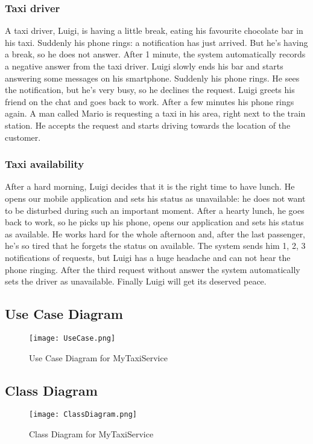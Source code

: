 		\subsubsection{Taxi driver}
			A taxi driver, Luigi, is having a little break, eating his favourite chocolate bar in his taxi. Suddenly
			his phone rings: a notification has just arrived. But he's having a break, so he does not answer.
			After 1 minute, the system automatically records a negative answer from the taxi driver.
			Luigi slowly ends his bar and starts answering some messages on his smartphone. Suddenly his phone
			rings. He sees the notification, but he's very busy, so he declines the request. Luigi greets his
			friend on the chat and goes back to work. After a few minutes his phone rings again. A man called
			Mario is requesting a taxi in his area, right next to the train station. He accepts the request and
			starts driving towards the location of the customer.
		\subsubsection{Taxi availability}
			After a hard morning, Luigi decides that it is the right time to have lunch. He opens our mobile
			application and sets his status as unavailable: he does not want to be disturbed during such an
			important moment. After a hearty lunch, he goes back to work, so he picks up his phone, opens our
			application and sets his status as available. He works hard for the whole afternoon and, after the
			last passenger, he's so tired that he forgets the status on available. The system sends him 1, 2, 3
			notifications of requests, but Luigi has a huge headache and can not hear the phone ringing. After
			the third request without answer the system automatically sets the driver as unavailable.
			Finally Luigi will get its deserved peace.
	\newpage
	\subsection{Use Case Diagram}
		\begin{figure}[h!]
			\centering
			\graphicspath{ {../SE2_IMAGES/} }
			\texttt{[image: UseCase.png]}
			\caption{Use Case Diagram for MyTaxiService}
		\end{figure}
	\newpage
	\subsection{Class Diagram}
		\begin{figure}[h!]
			\centering
			\graphicspath{ {../SE2_IMAGES/} }
			\texttt{[image: ClassDiagram.png]}
			\caption{Class Diagram for MyTaxiService}
		\end{figure}